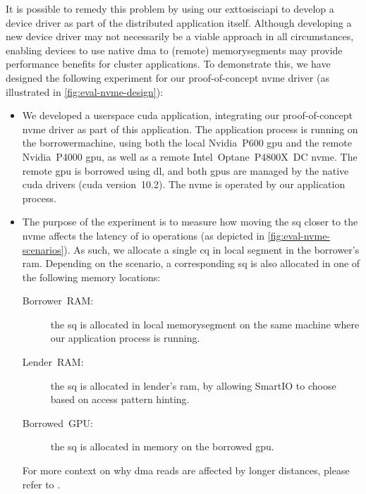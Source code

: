 It is possible to remedy this problem by using our \gls{exttosisciapi} to develop a device driver as part of the distributed application itself.
%
Although developing a new device driver may not necessarily be a viable approach in all circumstances, enabling devices to use native \gls{dma} to (remote) \glspl{memorysegment} may provide performance benefits for cluster applications.
%
To demonstrate this, we have designed the following experiment for our proof-of-concept \gls{nvme} driver (as illustrated in \cref{fig:eval-nvme-design}):
%
\begin{itemize}
    \item 
        We developed a \gls{userspace} \gls{cuda} application, integrating our proof-of-concept \gls{nvme} driver as part of this application.
        The application process is running on the \gls{borrowermachine}, using both the local Nvidia~P600 \gls{gpu} and the remote Nvidia~P4000 \gls{gpu}, as well as a remote Intel~Optane~P4800X~DC \gls{nvme}.
        The remote \gls{gpu} is borrowed using \gls{dl}, and both \glspl{gpu} are managed by the native \gls{cuda} drivers (\gls{cuda} version~10.2).
        The \gls{nvme} is operated by our application process.

    \item 
        The purpose of the experiment is to measure how moving the \gls{sq} closer to the \gls{nvme} affects the latency of \gls{io} operations (as depicted in \cref{fig:eval-nvme-scenarios}).
        As such, we allocate a single \gls{cq} in local \gls{segment} in the \gls{borrower}'s \gls{ram}.
        Depending on the scenario, a corresponding \gls{sq} is also allocated in one of the following memory locations:
        \begin{description}
            \item[Borrower~RAM:] the \gls{sq} is allocated in local \gls{memorysegment} on the same machine where our application process is running.
            \item[Lender~RAM:] the \gls{sq} is allocated in \gls{lender}'s \gls{ram}, by allowing SmartIO to choose based on access pattern hinting.
            \item[Borrowed~GPU:] the \gls{sq} is allocated in memory on the borrowed \gls{gpu}.
        \end{description}
        For more context on why \gls{dma} reads are affected by longer distances, please refer to .


\end{itemize}
